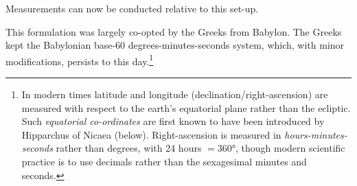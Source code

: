 Measurements can now be conducted relative to this set-up.


This formulation was largely co-opted by the Greeks from Babylon. The Greeks kept the Babylonian base-60 degrees-minutes-seconds system, which, with minor modifications, persists to this day.\footnote{In modern times latitude and longitude (declination/right-ascension) are measured with respect to the earth's equatorial plane rather than the ecliptic. Such \emph{equatorial co-ordinates} are first known to have been introduced by Hipparchus of Nicaea (below). Right-ascension is measured in \emph{hours-minutes-seconds} rather than degrees, with 24 hours $=\ang{360}$, though modern scientific practice is to use decimals rather than the sexagesimal minutes and seconds.}

\goodbreak

\label{pg:syene}

